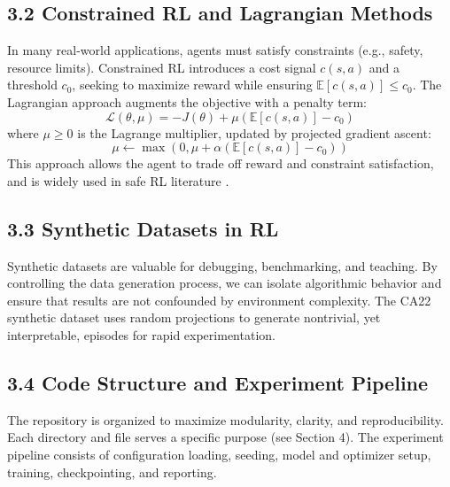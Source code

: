\documentclass[conference]{IEEEtran}
\begin{document}
\subsection*{3.2 Constrained RL and Lagrangian Methods}
In many real-world applications, agents must satisfy constraints (e.g., safety, resource limits). Constrained RL introduces a cost signal $c(s,a)$ and a threshold $c_0$, seeking to maximize reward while ensuring $\mathbb{E}[c(s,a)] \leq c_0$. The Lagrangian approach augments the objective with a penalty term:
\begin{equation}
\mathcal{L}(\theta, \mu) = -J(\theta) + \mu (\mathbb{E}[c(s,a)] - c_0)
\end{equation}
where $\mu \geq 0$ is the Lagrange multiplier, updated by projected gradient ascent:
\begin{equation}
\mu \leftarrow \max(0, \mu + \alpha (\mathbb{E}[c(s,a)] - c_0))
\end{equation}
This approach allows the agent to trade off reward and constraint satisfaction, and is widely used in safe RL literature \cite{Achiam2017}.

\subsection*{3.3 Synthetic Datasets in RL}
Synthetic datasets are valuable for debugging, benchmarking, and teaching. By controlling the data generation process, we can isolate algorithmic behavior and ensure that results are not confounded by environment complexity. The CA22 synthetic dataset uses random projections to generate nontrivial, yet interpretable, episodes for rapid experimentation.

\subsection*{3.4 Code Structure and Experiment Pipeline}
The repository is organized to maximize modularity, clarity, and reproducibility. Each directory and file serves a specific purpose (see Section 4). The experiment pipeline consists of configuration loading, seeding, model and optimizer setup, training, checkpointing, and reporting.
\end{document}
